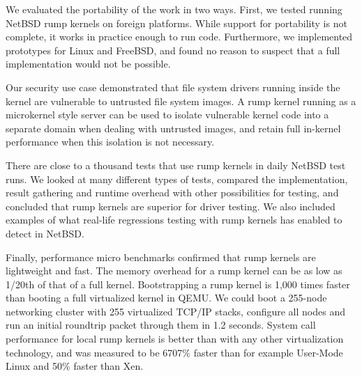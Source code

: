 We evaluated the portability of the work in two ways.  First, we
tested running NetBSD rump kernels on foreign platforms.  While
support for portability is not complete, it works in practice
enough to run code.  Furthermore, we implemented prototypes
for Linux and FreeBSD, and found no reason to
suspect that a full implementation would not be possible.

Our security use case demonstrated that file system drivers running
inside the kernel are vulnerable to untrusted file system images.
A rump kernel running as a microkernel style server can be used to
isolate vulnerable kernel code into a separate domain when dealing
with untrusted images, and retain full in-kernel performance when
this isolation is not necessary.

There are close to a thousand tests that use rump kernels in daily
NetBSD test runs.  We looked at many different types of tests,
compared the implementation, result gathering and runtime overhead
with other possibilities for testing, and concluded that rump
kernels are superior for driver testing.  We also included examples
of what real-life regressions testing with rump kernels has enabled
to detect in NetBSD.

Finally, performance micro benchmarks confirmed that rump kernels
are lightweight and fast.  The memory overhead for a rump kernel
can be as low as 1/20th of that of a full kernel.  Bootstrapping
a rump kernel is 1,000 times faster than booting a full virtualized
kernel in QEMU.  We could boot a 255-node networking cluster with
255 virtualized TCP/IP stacks, configure all nodes and run an
initial roundtrip packet through them in 1.2 seconds.  System call
performance for local rump kernels is better than with any other
virtualization technology, and was measured to be 6707\% faster
than for example User-Mode Linux and 50\% faster than Xen.
